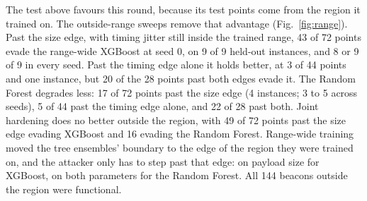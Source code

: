 \documentclass[preprint,12pt]{elsarticle}
\begin{document}
The test above favours this round, because its test points come from the region it trained on. The
outside-range sweeps remove that advantage (Fig.~\ref{fig:range}). Past the size edge, with timing jitter
still inside the trained range, 43 of 72 points evade the range-wide XGBoost at seed 0, on 9 of 9
held-out instances, and 8 or 9 of 9 in every seed. Past the timing edge alone it holds better, at 3 of
44 points and one instance, but 20 of the 28 points past both edges evade it. The Random Forest degrades
less: 17 of 72 points past the size edge (4 instances; 3 to 5 across seeds), 5 of 44 past the timing edge
alone, and 22 of 28 past both. Joint hardening does no better outside the region, with 49 of 72 points
past the size edge evading XGBoost and 16 evading the Random Forest. Range-wide training moved the tree
ensembles' boundary to the edge of the region they were trained on, and the attacker only has to step
past that edge: on payload size for XGBoost, on both parameters for the Random Forest. All 144 beacons
outside the region were functional.
\end{document}
